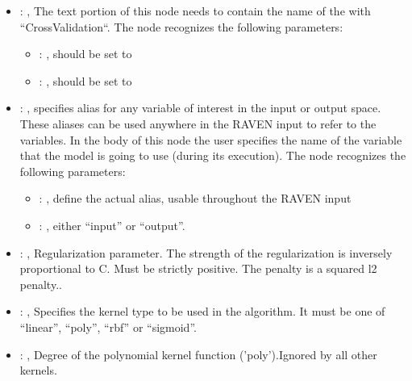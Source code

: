 \begin{itemize}
    \item {}: , 
      The text portion of this node needs to contain the name of the  with
               ``CrossValidation``.
      The  node recognizes the following parameters:
        \begin{itemize}
          \item {}: , 
            should be set to 
          \item {}: , 
            should be set to 
      \end{itemize}

    \item {}: , 
      specifies alias for         any variable of interest in the input or output space. These
      aliases can be used anywhere in the RAVEN input to         refer to the variables. In the body
      of this node the user specifies the name of the variable that the model is going to use
      (during its execution).
      The  node recognizes the following parameters:
        \begin{itemize}
          \item {}: , 
            define the actual alias, usable throughout the RAVEN input
          \item {}: , 
            either ``input'' or ``output''.
      \end{itemize}

    \item {}: , 
      Regularization parameter. The strength of the regularization is inversely
      proportional to C.                                                            Must be strictly
      positive. The penalty is a squared l2 penalty..

    \item {}: , 
      Specifies the kernel type to be used in the algorithm. It must be one of
      ``linear'', ``poly'', ``rbf'' or ``sigmoid''.

    \item {}: , 
      Degree of the polynomial kernel function ('poly').Ignored by all other kernels.


\end{itemize}
